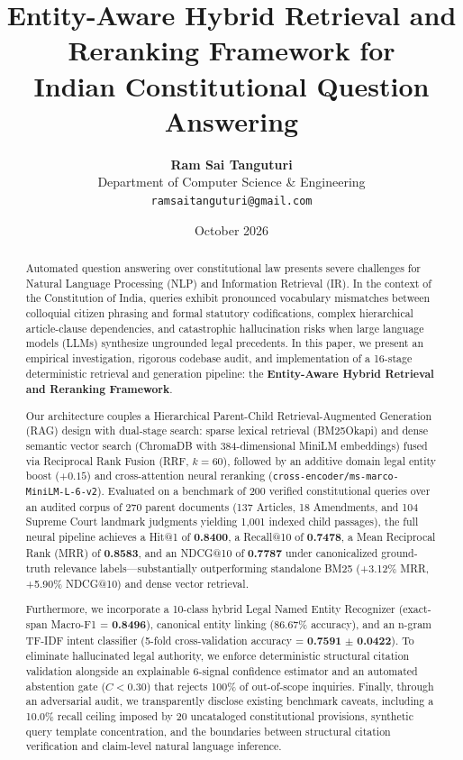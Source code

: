 \documentclass[10pt,twocolumn]{article}
\title{\textbf{\Large Entity-Aware Hybrid Retrieval and Reranking Framework for\\Indian Constitutional Question Answering}}
\author{
    \textbf{Ram Sai Tanguturi}\\[2pt]
    \normalsize Department of Computer Science \& Engineering\\[1pt]
    \normalsize \texttt{ramsaitanguturi@gmail.com}
}
\date{October 2026}
\begin{document}
\maketitle

\begin{abstract}
Automated question answering over constitutional law presents severe challenges for Natural Language Processing (NLP) and Information Retrieval (IR). In the context of the Constitution of India, queries exhibit pronounced vocabulary mismatches between colloquial citizen phrasing and formal statutory codifications, complex hierarchical article-clause dependencies, and catastrophic hallucination risks when large language models (LLMs) synthesize ungrounded legal precedents. In this paper, we present an empirical investigation, rigorous codebase audit, and implementation of a 16-stage deterministic retrieval and generation pipeline: the \textbf{Entity-Aware Hybrid Retrieval and Reranking Framework}. 

Our architecture couples a Hierarchical Parent-Child Retrieval-Augmented Generation (RAG) design with dual-stage search: sparse lexical retrieval (BM25Okapi) and dense semantic vector search (ChromaDB with 384-dimensional MiniLM embeddings) fused via Reciprocal Rank Fusion (RRF, $k=60$), followed by an additive domain legal entity boost ($+0.15$) and cross-attention neural reranking (\texttt{cross-encoder/ms-marco-MiniLM-L-6-v2}). Evaluated on a benchmark of 200 verified constitutional queries over an audited corpus of 270 parent documents (137 Articles, 18 Amendments, and 104 Supreme Court landmark judgments yielding 1,001 indexed child passages), the full neural pipeline achieves a Hit@1 of \textbf{0.8400}, a Recall@10 of \textbf{0.7478}, a Mean Reciprocal Rank (MRR) of \textbf{0.8583}, and an NDCG@10 of \textbf{0.7787} under canonicalized ground-truth relevance labels---substantially outperforming standalone BM25 (+3.12\% MRR, +5.90\% NDCG@10) and dense vector retrieval. 

Furthermore, we incorporate a 10-class hybrid Legal Named Entity Recognizer (exact-span Macro-F1 = \textbf{0.8496}), canonical entity linking (86.67\% accuracy), and an n-gram TF-IDF intent classifier (5-fold cross-validation accuracy = \textbf{0.7591} $\pm$ \textbf{0.0422}). To eliminate hallucinated legal authority, we enforce deterministic structural citation validation alongside an explainable 6-signal confidence estimator and an automated abstention gate ($C < 0.30$) that rejects 100\% of out-of-scope inquiries. Finally, through an adversarial audit, we transparently disclose existing benchmark caveats, including a 10.0\% recall ceiling imposed by 20 uncataloged constitutional provisions, synthetic query template concentration, and the boundaries between structural citation verification and claim-level natural language inference.
\end{abstract}
\end{document}
